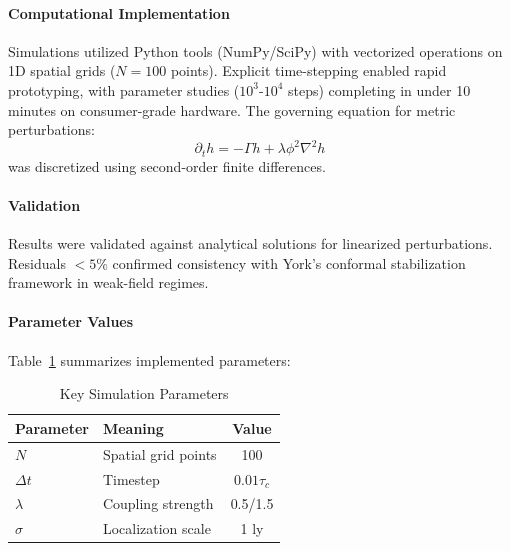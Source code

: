 \documentclass[twocolumn]{article}
\begin{document}
	\paragraph{Computational Implementation}
	Simulations utilized Python tools (NumPy/SciPy) with vectorized operations on 1D spatial grids (\(N = 100\) points). Explicit time-stepping enabled rapid prototyping, with parameter studies (\(10^3\)-\(10^4\) steps) completing in under 10 minutes on consumer-grade hardware. The governing equation for metric perturbations:
	\begin{equation}
		\partial_t h = -\Gamma h + \lambda\phi^2 \nabla^2 h
	\end{equation}
	was discretized using second-order finite differences.
	
	\paragraph{Validation}
	Results were validated against analytical solutions for linearized perturbations. Residuals \(<5\%\) confirmed consistency with York's conformal stabilization framework\cite{york1972} in weak-field regimes.
	
	\paragraph{Parameter Values}
	Table~\ref{tab:params} summarizes implemented parameters:
	\begin{table}[htbp]
		\centering
		\caption{Key Simulation Parameters}\label{tab:params}
		\begin{tabularx}{\columnwidth}{@{}llc@{}}
			\toprule
			\textbf{Parameter} & \textbf{Meaning} & \textbf{Value} \\
			\midrule
			\(N\) & Spatial grid points & 100 \\
			\(\Delta t\) & Timestep & \(0.01\tau_c\) \\
			\(\lambda\) & Coupling strength & 0.5/1.5 \\
			\(\sigma\) & Localization scale & 1 ly \\
			\bottomrule
		\end{tabularx}
	\end{table}
	
\end{document}
